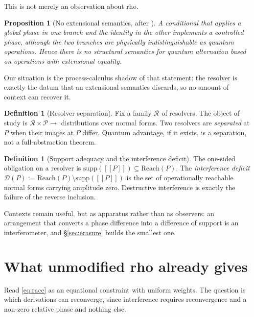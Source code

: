 \documentclass[11pt,a4paper]{article}
\theoremstyle{plain}
\newtheorem{proposition}[theorem]{Proposition}
\theoremstyle{definition}
\newtheorem{definition}[theorem]{Definition}
\theoremstyle{remark}
\newcommand{\sem}[1]{[\![#1]\!]}
\newcommand{\Proc}{\mathcal{P}}
\newcommand{\Reach}{\mathrm{Reach}}
\newcommand{\supp}{\mathrm{supp}}
\begin{document}
This is not merely an observation about rho.

\begin{proposition}[No extensional semantics, after
\cite{BadescuPanangaden}]\label{prop:noext}
A conditional that applies a global phase in one branch and the identity in the
other implements a controlled phase, although the two branches are physically
indistinguishable as quantum operations. Hence there is no structural semantics
for quantum alternation based on operations with extensional equality.
\end{proposition}

Our situation is the process-calculus shadow of that statement: the resolver is
exactly the datum that an extensional semantics discards, so no amount of
context can recover it.

\begin{definition}[Resolver separation]\label{def:sep}
Fix a family $\mathcal{R}$ of resolvers. The object of study is
$\mathcal{R} \times \Proc \to$ distributions over normal forms. Two resolvers
are \emph{separated} at $P$ when their images at $P$ differ. Quantum advantage,
if it exists, is a separation, not a full-abstraction theorem.
\end{definition}

\begin{definition}[Support adequacy and the interference
deficit]\label{def:deficit}
The one-sided obligation on a resolver is
$\supp(\sem{P}) \subseteq \Reach(P)$. The \emph{interference deficit}
$\mathcal{D}(P) := \Reach(P) \setminus \supp(\sem{P})$ is the set of
operationally reachable normal forms carrying amplitude zero. Destructive
interference is exactly the failure of the reverse inclusion.
\end{definition}

Contexts remain useful, but as apparatus rather than as observers: an
arrangement that converts a phase difference into a difference of support is an
interferometer, and \S\ref{sec:erasure} builds the smallest one.

\section{What unmodified rho already gives}\label{sec:stage1}

Read \eqref{eq:race} as an equational constraint with uniform weights. The
question is which derivations can reconverge, since interference requires
reconvergence and a non-zero relative phase and nothing else.
\end{document}
